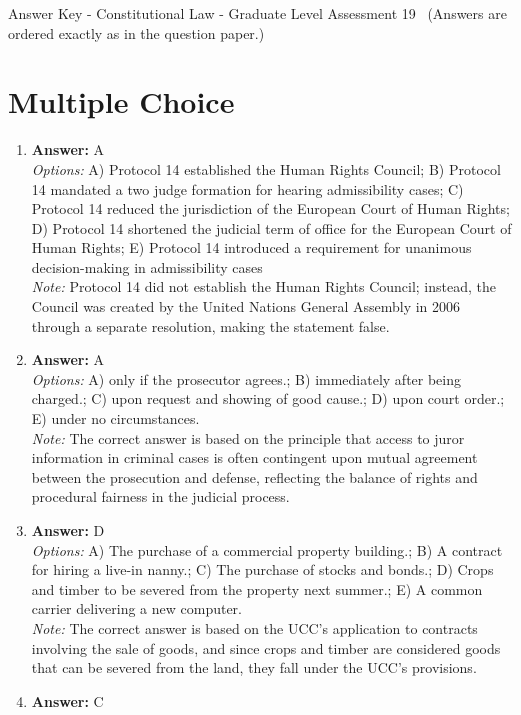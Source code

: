 \documentclass[12pt]{article}
\begin{document}
\begin{center}
Answer Key - Constitutional Law - Graduate Level Assessment 19 \
\small (Answers are ordered exactly as in the question paper.)
\end{center}

\section*{Multiple Choice}
\begin{enumerate}[label=\arabic*.]
\item \textbf{Answer:} A
\\ \textit{Options:} A) Protocol 14 established the Human Rights Council; B) Protocol 14 mandated a two judge formation for hearing admissibility cases; C) Protocol 14 reduced the jurisdiction of the European Court of Human Rights; D) Protocol 14 shortened the judicial term of office for the European Court of Human Rights; E) Protocol 14 introduced a requirement for unanimous decision-making in admissibility cases
\\ \textit{Note:} Protocol 14 did not establish the Human Rights Council; instead, the Council was created by the United Nations General Assembly in 2006 through a separate resolution, making the statement false.
\item \textbf{Answer:} A
\\ \textit{Options:} A) only if the prosecutor agrees.; B) immediately after being charged.; C) upon request and showing of good cause.; D) upon court order.; E) under no circumstances.
\\ \textit{Note:} The correct answer is based on the principle that access to juror information in criminal cases is often contingent upon mutual agreement between the prosecution and defense, reflecting the balance of rights and procedural fairness in the judicial process.
\item \textbf{Answer:} D
\\ \textit{Options:} A) The purchase of a commercial property building.; B) A contract for hiring a live-in nanny.; C) The purchase of stocks and bonds.; D) Crops and timber to be severed from the property next summer.; E) A common carrier delivering a new computer.
\\ \textit{Note:} The correct answer is based on the UCC's application to contracts involving the sale of goods, and since crops and timber are considered goods that can be severed from the land, they fall under the UCC's provisions.
\item \textbf{Answer:} C

\end{enumerate}
\end{document}
